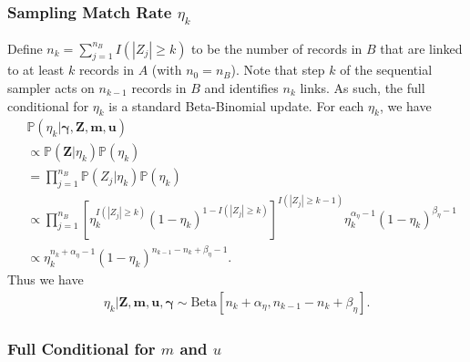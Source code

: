 \documentclass[12pt,letterpaper]{article}
\newcommand{\1}[1]{\mathbb{I}\!\left[#1\right]} %
\begin{document}

\subsubsection{Sampling Match Rate $\eta_k$}\label{app:sample-eta}

Define $n_k = \sum_{j=1}^{n_B} I\left(|Z_j| \geq k\right)$ to be the number of records in $B$ that are linked to at least $k$ records in $A$ (with $n_0 = n_B$). Note that step $k$ of the sequential sampler acts on $n_{k-1}$ records in $B$ and identifies $n_k$ links. As such, the full conditional for $\eta_k$ is a standard Beta-Binomial update. For each $\eta_k$, we have
\begin{align*}
	&\mathbb{P}\left(\eta_k \big| \bm{\gamma}, \bm{Z}, \bm{m}, \bm{u}\right) \\
	&\propto \mathbb{P}\left(\bm{Z}| \eta_k\right) \mathbb{P}(\eta_k) \\
	&=\prod_{j=1}^{n_B} \mathbb{P}\left(Z_{j} | \eta_k\right) \mathbb{P}(\eta_k) \\
	&\propto \prod_{j=1}^{n_B} \left[\eta_k^{I\left(|Z_j| \geq k \right)} (1 - \eta_k)^{1 - I\left(|Z_j| \geq k \right)}\right]^{I\left(|Z_j| \geq k-1 \right)} \eta_k^{\alpha_{\eta} - 1}(1 - \eta_k)^{\beta_{\eta} - 1} \\
	&\propto \eta_k^{n_{k} + \alpha_{\eta} - 1} (1 - \eta_k)^{n_{k-1} - n_{k} + \beta_{\eta} - 1}.
\end{align*}
Thus we have
\begin{align*}
	\eta_k |\bm{Z}, \bm{m}, \bm{u}, \bm{\gamma} \sim \text{Beta}\left[n_{k} + \alpha_{\eta}, n_{k-1} - n_{k} + \beta_{\eta} \right].
\end{align*}

\subsubsection{Full Conditional for $m$ and $u$}\label{app:derive-m-u}
\end{document}
